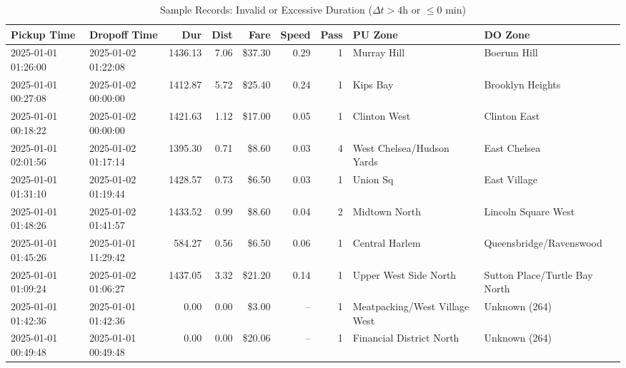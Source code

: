 \documentclass[11pt,a4paper]{article}
\begin{document}
\begin{table}[htbp]
\centering
\caption{Sample Records: Invalid or Excessive Duration ($\Delta t > 4$h or $\le 0$ min)}
\label{tab:sample_duration}
\tiny
\begin{tabularx}{\textwidth}{l l r r r r r X X}
\toprule
\textbf{Pickup Time} & \textbf{Dropoff Time} & \textbf{Dur} & \textbf{Dist} & \textbf{Fare} & \textbf{Speed} & \textbf{Pass} & \textbf{PU Zone} & \textbf{DO Zone} \\
\midrule
2025-01-01 01:26:00 & 2025-01-02 01:22:08 & 1436.13 & 7.06 & \$37.30 & 0.29 & 1 & Murray Hill & Boerum Hill \\
2025-01-01 00:27:08 & 2025-01-02 00:00:00 & 1412.87 & 5.72 & \$25.40 & 0.24 & 1 & Kips Bay & Brooklyn Heights \\
2025-01-01 00:18:22 & 2025-01-02 00:00:00 & 1421.63 & 1.12 & \$17.00 & 0.05 & 1 & Clinton West & Clinton East \\
2025-01-01 02:01:56 & 2025-01-02 01:17:14 & 1395.30 & 0.71 & \$8.60 & 0.03 & 4 & West Chelsea/Hudson Yards & East Chelsea \\
2025-01-01 01:31:10 & 2025-01-02 01:19:44 & 1428.57 & 0.73 & \$6.50 & 0.03 & 1 & Union Sq & East Village \\
2025-01-01 01:48:26 & 2025-01-02 01:41:57 & 1433.52 & 0.99 & \$8.60 & 0.04 & 2 & Midtown North & Lincoln Square West \\
2025-01-01 01:45:26 & 2025-01-01 11:29:42 & 584.27 & 0.56 & \$6.50 & 0.06 & 1 & Central Harlem & Queensbridge/Ravenswood \\
2025-01-01 01:09:24 & 2025-01-02 01:06:27 & 1437.05 & 3.32 & \$21.20 & 0.14 & 1 & Upper West Side North & Sutton Place/Turtle Bay North \\
2025-01-01 01:42:36 & 2025-01-01 01:42:36 & 0.00 & 0.00 & \$3.00 & -- & 1 & Meatpacking/West Village West & Unknown (264) \\
2025-01-01 00:49:48 & 2025-01-01 00:49:48 & 0.00 & 0.00 & \$20.06 & -- & 1 & Financial District North & Unknown (264) \\
\bottomrule
\end{tabularx}
\end{table}
\end{document}
